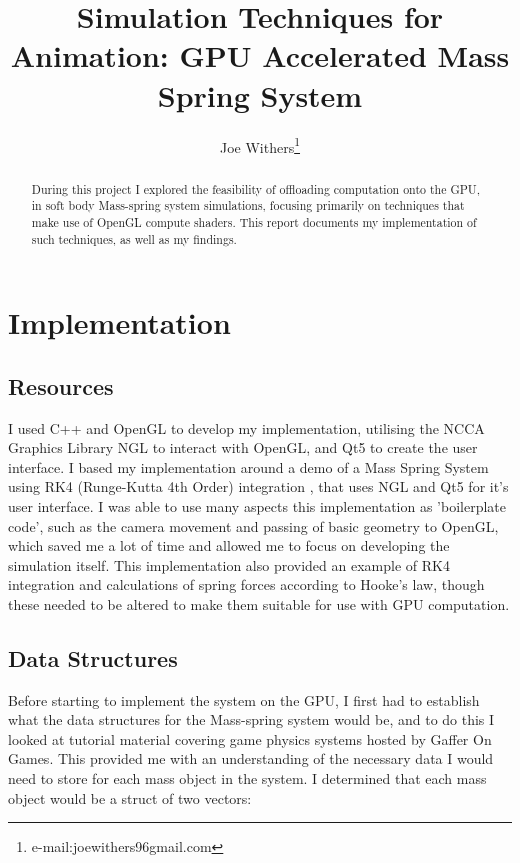 \documentclass[]{acmsiggraph}
\title{Simulation Techniques for Animation: GPU Accelerated Mass Spring System}
\author{Joe Withers\thanks{e-mail:joewithers96gmail.com}}
\begin{document}

\maketitle

\begin{abstract}
During this project I explored the feasibility of offloading computation onto the GPU, in soft body Mass-spring system simulations, focusing primarily on techniques that make use of OpenGL compute shaders. This report documents my implementation of such techniques, as well as my findings.
\end{abstract}

\section{Implementation} \label{sec:implementation}

\subsection{Resources}
I used C++ and OpenGL to develop my implementation, utilising the NCCA Graphics Library NGL \cite{ngl} to interact with OpenGL, and Qt5 to create the user interface. I based my implementation around a demo of a Mass Spring System using RK4 (Runge-Kutta 4th Order) integration \cite{nglMassSpring}, that uses NGL and Qt5 for it's user interface. I was able to use many aspects this implementation as 'boilerplate code', such as the camera movement and passing of basic geometry to OpenGL, which saved me a lot of time and allowed me to focus on developing the simulation itself. This implementation also provided an example of RK4 integration and calculations of spring forces according to Hooke's law, though these needed to be altered to make them suitable for use with GPU computation.

\subsection{Data Structures}

Before starting to implement the system on the GPU, I first had to establish what the data structures for the Mass-spring system would be, and to do this I looked at tutorial material covering game physics systems \cite{gafferPhys} hosted by Gaffer On Games. This provided me with an understanding of the necessary data I would need to store for each mass object in the system. I determined that each mass object would be a struct of two vectors:
\end{document}
